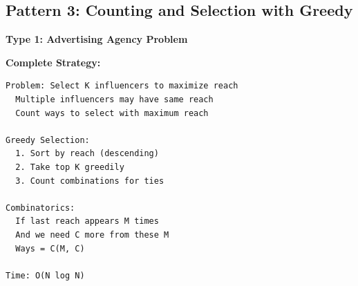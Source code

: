 \documentclass[11pt,a4paper,oneside]{book}
\begin{document}
\subsection{Pattern 3: Counting and Selection with Greedy}

\begin{tcolorbox}[
    enhanced,breakable,
    colback=warnyellow!10,
    colframe=warnyellow,
    boxrule=2pt,
    arc=4mm,
    title=\textbf{Complete Counting Selection Algorithms}
]
\textbf{Type 1: Advertising Agency Problem}

\textbf{Complete Strategy:}
\begin{verbatim}
Problem: Select K influencers to maximize reach
  Multiple influencers may have same reach
  Count ways to select with maximum reach

Greedy Selection:
  1. Sort by reach (descending)
  2. Take top K greedily
  3. Count combinations for ties

Combinatorics:
  If last reach appears M times
  And we need C more from these M
  Ways = C(M, C)

Time: O(N log N)
\end{verbatim}
\end{tcolorbox}
\end{document}
